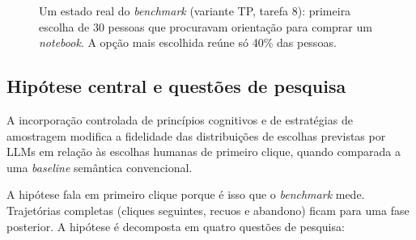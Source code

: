 \documentclass[12pt,oneside,a4paper,chapter=TITLE,english,brazil]{abntex2}
\begin{document}
\begin{figure}[htb]
\centering
\caption{Um estado real do \textit{benchmark} (variante TP, tarefa 8): primeira escolha de 30 pessoas que procuravam orientação para comprar um \textit{notebook}. A opção mais escolhida reúne só 40\% das pessoas.}
\label{fig:exemplo}
\end{figure}

\subsection{Hipótese central e questões de pesquisa}

\begin{destaque}
A incorporação controlada de princípios cognitivos e de estratégias de amostragem modifica a fidelidade das distribuições de escolhas previstas por LLMs em relação às escolhas humanas de primeiro clique, quando comparada a uma \textit{baseline} semântica convencional.
\end{destaque}

A hipótese fala em primeiro clique porque é isso que o \textit{benchmark} mede. Trajetórias completas (cliques seguintes, recuos e abandono) ficam para uma fase posterior. A hipótese é decomposta em quatro questões de pesquisa:
\end{document}
